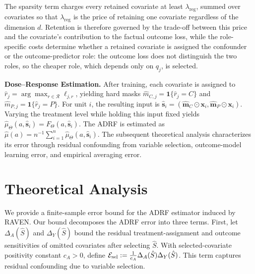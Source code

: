 \documentclass[twoside]{article}
\theoremstyle{plain}
\theoremstyle{definition}
\theoremstyle{remark}
\newtheorem{proof sketch}[theorem]{Proof Sketch}
\begin{document}

The sparsity term charges every retained covariate at least $\lambda_{\mathrm{reg}}$, summed over covariates so that $\lambda_{\mathrm{reg}}$ is the price of retaining one covariate regardless of the dimension $d$. Retention is therefore governed by the trade-off between this price and the covariate's contribution to the factual outcome loss, while the role-specific costs determine whether a retained covariate is assigned the confounder or the outcome-predictor role: the outcome loss does not distinguish the two roles, so the cheaper role, which depends only on $q_j$, is selected. 

\textbf{Dose--Response Estimation.}
After training, each covariate is assigned to $\widehat{r}_j=\arg\max_{r\in\mathcal{R}}\ell_{j,r}$, yielding hard masks $\widehat{m}_{C,j}=\mathbf{1}\{\widehat{r}_j=C\}$ and $\widehat{m}_{P,j}=\mathbf{1}\{\widehat{r}_j=P\}$.
For unit $i$, the resulting input is $\widehat{\mathbf{s}}_i=(\widehat{\mathbf{m}}_C\odot\mathbf{x}_i,\widehat{\mathbf{m}}_P\odot\mathbf{x}_i)$.
Varying the treatment level while holding this input fixed yields $\widehat{\mu}_\Theta(a,\widehat{\mathbf{s}}_i)=F_\Theta(a,\widehat{\mathbf{s}}_i)$.
The ADRF is estimated as $\widehat{\mu}(a)=n^{-1}\sum_{i=1}^{n}\widehat{\mu}_\Theta(a,\widehat{\mathbf{s}}_i)$.
The subsequent theoretical analysis characterizes its error through residual confounding from variable selection, outcome-model learning error, and empirical averaging error.

\section{Theoretical Analysis}
We provide a finite-sample error bound for the ADRF estimator induced by RAVEN.
Our bound decomposes the ADRF error into three terms.
First, let $\Delta_A(\hat S)$ and $\Delta_Y(\hat S)$ bound the residual treatment-assignment and outcome sensitivities of omitted covariates after selecting $\hat S$.
With selected-covariate positivity constant $c_A>0$, define $\mathcal E_{\rm sel}:=\frac{1}{c_A}\Delta_A(\hat S)\Delta_Y(\hat S)$.
This term captures residual confounding due to variable selection.
\end{document}
